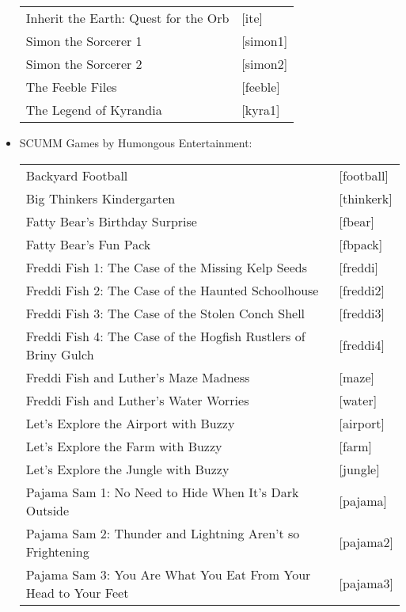 \begin{itemize}
\begin{tabular}[h]{ll}
    Inherit the Earth: Quest for the Orb&          [ite]\\
    Simon the Sorcerer 1&                          [simon1]\\
    Simon the Sorcerer 2&                          [simon2]\\
    The Feeble Files&                              [feeble]\\
    The Legend of Kyrandia&                        [kyra1]\\
  \end{tabular}
\item SCUMM Games by Humongous Entertainment:\\
  \begin{tabular}[h]{ll}
    Backyard Football&                             [football]\\
    Big Thinkers Kindergarten&                     [thinkerk]\\
    Fatty Bear's Birthday Surprise&                [fbear]\\
    Fatty Bear's Fun Pack&                         [fbpack]\\
    Freddi Fish 1: The Case of the Missing
        Kelp Seeds&                                [freddi]\\
    Freddi Fish 2: The Case of the Haunted
        Schoolhouse&                               [freddi2]\\
    Freddi Fish 3: The Case of the Stolen
        Conch Shell&                               [freddi3]\\
    Freddi Fish 4: The Case of the Hogfish
        Rustlers of Briny Gulch&                   [freddi4]\\
    Freddi Fish and Luther's Maze Madness&         [maze]\\
    Freddi Fish and Luther's Water Worries&        [water]\\
    Let's Explore the Airport with Buzzy&          [airport]\\
    Let's Explore the Farm with Buzzy&             [farm]\\
    Let's Explore the Jungle with Buzzy&           [jungle]\\
    Pajama Sam 1: No Need to Hide When It's
        Dark Outside&                              [pajama]\\
    Pajama Sam 2: Thunder and Lightning
        Aren't so Frightening&                     [pajama2]\\
    Pajama Sam 3: You Are What You Eat
        From Your Head to Your Feet&               [pajama3]\\

\end{tabular}
\end{itemize}
